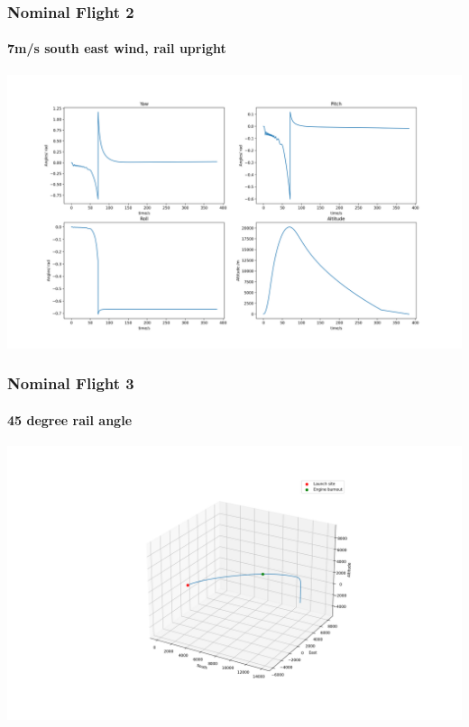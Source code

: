 \documentclass{beamer}
\begin{document}
    \begin{frame}
        \frametitle{Nominal Flight 2}
        \framesubtitle{7m/s south east wind, rail upright}
        \begin{center}
            \includegraphics[width=\textwidth]{images/example2b.png}
        \end{center}
    \end{frame}
    \begin{frame}
        \frametitle{Nominal Flight 3}
        \framesubtitle{45 degree rail angle}
        \begin{center}
            \includegraphics[width=\textwidth]{images/example3.png}
        \end{center}
    \end{frame}
\end{document}
